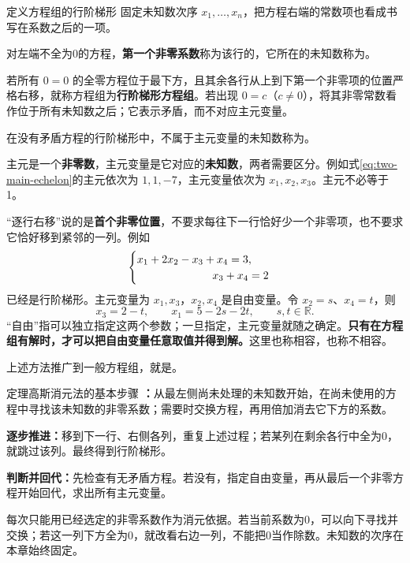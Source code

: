 \documentclass[a4paper,12pt,twoside,openany,fontset=none]{ctexbook}
\newcounter{theorem}[chapter]
\newenvironment{theorem}[1][]{\begin{thmBox}{定理}{#1}}{\end{thmBox}}
\newcounter{definition}[chapter]
\newenvironment{definition}[1][]{\begin{defBox}{定义}{#1}}{\end{defBox}}
\numberwithin{equation}{chapter}
\begin{document}
\begin{definition}[方程组的行阶梯形]
固定未知数次序 $x_1,\ldots,x_n$，把方程右端的常数项也看成书写在系数之后的一项。

对左端不全为0的方程，\textbf{第一个非零系数}称为该行的\textbf{}，它所在的未知数称为\textbf{}。

若所有 $0=0$ 的全零方程位于最下方，且其余各行从上到下第一个非零项的位置严格右移，就称方程组为\textbf{行阶梯形方程组}。若出现 $0=c$（$c\ne0$），将其非零常数看作位于所有未知数之后；它表示矛盾，而不对应主元变量。

在没有矛盾方程的行阶梯形中，不属于主元变量的未知数称为\textbf{}。
\end{definition}

主元是一个\textbf{非零数}，主元变量是它对应的\textbf{未知数}，两者需要区分。例如式\eqref{eq:two-main-echelon}的主元依次为 $1,1,-7$，主元变量依次为 $x_1,x_2,x_3$。主元不必等于1。

“逐行右移”说的是\textbf{首个非零位置}，不要求每往下一行恰好少一个非零项，也不要求它恰好移到紧邻的一列。例如
\[
    \begin{cases}
        x_1+2x_2-x_3+x_4=3,\\
        \hspace{24mm}x_3+x_4=2
    \end{cases}
\]
已经是行阶梯形。主元变量为 $x_1,x_3$，$x_2,x_4$ 是自由变量。令 $x_2=s$、$x_4=t$，则
\[
    x_3=2-t,\qquad x_1=5-2s-2t,\qquad s,t\in\mathbb R.
\]
“自由”指可以独立指定这两个参数；一旦指定，主元变量就随之确定。\textbf{只有在方程组有解时，才可以把自由变量任意取值并得到解。}这里也称相容，也称不相容。

上述方法推广到一般方程组，就是。

\begin{theorem}[高斯消元法的基本步骤]
\textbf{：}从最左侧尚未处理的未知数开始，在尚未使用的方程中寻找该未知数的非零系数；需要时交换方程，再用倍加消去它下方的系数。

\textbf{逐步推进：}移到下一行、右侧各列，重复上述过程；若某列在剩余各行中全为0，就跳过该列。最终得到行阶梯形。

\textbf{判断并回代：}先检查有无矛盾方程。若没有，指定自由变量，再从最后一个非零方程开始回代，求出所有主元变量。
\end{theorem}

每次只能用已经选定的非零系数作为消元依据。若当前系数为0，可以向下寻找并交换；若这一列下方全为0，就改看右边一列，不能把0当作除数。未知数的次序在本章始终固定。
\end{document}
